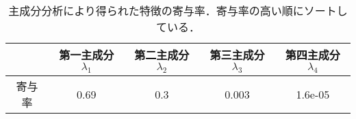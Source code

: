 \begin{table}[h]
  \centering
    \begin{tabular}{|c||c|c|c|c|} \hline
       & 第一主成分$\lambda_1$ & 第二主成分$\lambda_2$ & 第三主成分$\lambda_3$ & 第四主成分$\lambda_4$ \\ \hline
      寄与率 & 0.69 & 0.3 & 0.003 & 1.6e-05 \\ \hline
    \end{tabular}
  \caption{主成分分析により得られた特徴の寄与率．寄与率の高い順にソートしている．}
  \label{tab:pca_ratio}
\end{table}
